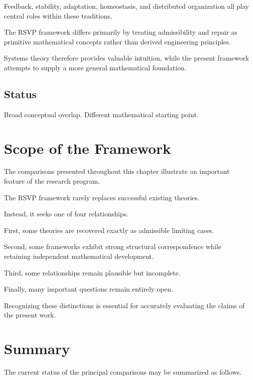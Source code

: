 \documentclass[11pt,oneside]{book}
\numberwithin{equation}{chapter}
\theoremstyle{definition}
\theoremstyle{plain}
\begin{document}
Feedback, stability, adaptation, homeostasis, and distributed organization
all play central roles within these traditions.

The RSVP framework differs primarily by treating admissibility and repair
as primitive mathematical concepts rather than derived engineering
principles.

Systems theory therefore provides valuable intuition, while the present
framework attempts to supply a more general mathematical foundation.

\subsection*{Status}

Broad conceptual overlap. Different mathematical starting point.

\section{Scope of the Framework}

The comparisons presented throughout this chapter illustrate an important
feature of the research program.

The RSVP framework rarely replaces successful existing theories.

Instead, it seeks one of four relationships.

First, some theories are recovered exactly as admissible limiting cases.

Second, some frameworks exhibit strong structural correspondence while
retaining independent mathematical development.

Third, some relationships remain plausible but incomplete.

Finally, many important questions remain entirely open.

Recognizing these distinctions is essential for accurately evaluating the
claims of the present work.

\section{Summary}

The current status of the principal comparisons may be summarized as
follows.
\end{document}
